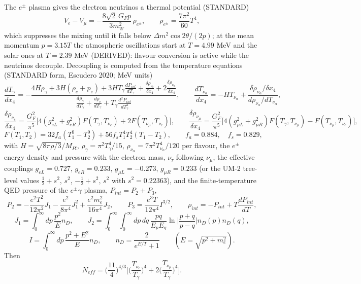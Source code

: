 \documentclass[
  10pt,
]{article}
\begin{document}
The \(e^\pm\) plasma gives the electron neutrinos a thermal potential
(STANDARD)
\[ V_e - V_\mu = -\frac{8\sqrt2\,G_Fp}{3m_W^2}\,\rho_{e^\pm},\qquad \rho_{e^\pm} = \frac{7\pi^2}{60}T^4 , \]
which suppresses the mixing until it falls below
\(\Delta m^2\cos2\theta/(2p)\); at the mean momentum \(p = 3.15T\) the
atmospheric oscillations start at \(T = 4.99\) MeV and the solar ones at
\(T = 2.39\) MeV (DERIVED): flavour conversion is active while the
neutrinos decouple. Decoupling is computed from the temperature
equations (STANDARD form, Escudero 2020; MeV units)
\[ \frac{dT_\gamma}{dx_4} = -\frac{4H\rho_\gamma + 3H(\rho_e + p_e) + 3HT_\gamma\frac{dP_{int}}{dT_\gamma} + \frac{\delta\rho_{\nu_e}}{\delta x_4} + 2\frac{\delta\rho_{\nu_\mu}}{\delta x_4}}
   {\frac{d\rho_\gamma}{dT_\gamma} + \frac{d\rho_e}{dT_\gamma} + T_\gamma\frac{d^2P_{int}}{dT_\gamma^2}},\qquad
   \frac{dT_{\nu_\alpha}}{dx_4} = -HT_{\nu_\alpha} + \frac{\delta\rho_{\nu_\alpha}/\delta x_4}{d\rho_{\nu_\alpha}/dT_{\nu_\alpha}}, \]
\[ \frac{\delta\rho_{\nu_e}}{\delta x_4} = \frac{G_F^2}{\pi^5}\Big[4(g_{eL}^2 + g_{eR}^2)F(T_\gamma, T_{\nu_e}) + 2F(T_{\nu_\mu}, T_{\nu_e})\Big],\qquad
   \frac{\delta\rho_{\nu_\mu}}{\delta x_4} = \frac{G_F^2}{\pi^5}\Big[4(g_{\mu L}^2 + g_{\mu R}^2)F(T_\gamma, T_{\nu_\mu}) - F(T_{\nu_\mu}, T_{\nu_e})\Big], \]
\[ F(T_1, T_2) = 32f_a(T_1^9 - T_2^9) + 56f_sT_1^4T_2^4(T_1 - T_2),\qquad f_a = 0.884,\quad f_s = 0.829, \]
with \(H = \sqrt{8\pi\rho/3}/M_{Pl}\),
\(\rho_\gamma = \pi^2T_\gamma^4/15\),
\(\rho_{\nu_\alpha} = 7\pi^2T_{\nu_\alpha}^4/120\) per flavour, the
\(e^\pm\) energy density and pressure with the electron mass,
\(\nu_\tau\) following \(\nu_\mu\), the effective couplings
\(g_{eL} = 0.727\), \(g_{eR} = 0.233\), \(g_{\mu L} = -0.273\),
\(g_{\mu R} = 0.233\) (or the UM-2 tree-level values \(\frac12 + s^2\),
\(s^2\), \(-\frac12 + s^2\), \(s^2\) with \(s^2 = 0.22363\)), and the
finite-temperature QED pressure of the \(e^\pm\gamma\) plasma,
\(P_{int} = P_2 + P_3\),
\[ P_2 = -\frac{e^2T^2}{12\pi^2}J_1 - \frac{e^2}{8\pi^4}J_1^2 + \frac{e^2m_e^2}{16\pi^4}J_2,\qquad P_3 = \frac{e^3T}{12\pi^4}I^{3/2},\qquad \rho_{int} = -P_{int} + T\frac{dP_{int}}{dT}, \]
\[ J_1 = \int_0^\infty dp\,\frac{p^2}{E}n_D,\qquad J_2 = \int_0^\infty\!\!\int_0^\infty dp\,dq\,\frac{pq}{E_pE_q}\ln\Big\lvert\frac{p + q}{p - q}\Big\rvert n_D(p)n_D(q), \]
\[ I = \int_0^\infty dp\,\frac{p^2 + E^2}{E}n_D,\qquad n_D = \frac{2}{e^{E/T} + 1}\qquad (E = \sqrt{p^2 + m_e^2}). \]
Then
\[ N_{eff} = \Big(\frac{11}{4}\Big)^{4/3}\Big[\Big(\frac{T_{\nu_e}}{T_\gamma}\Big)^4 + 2\Big(\frac{T_{\nu_\mu}}{T_\gamma}\Big)^4\Big]. \]
\end{document}
